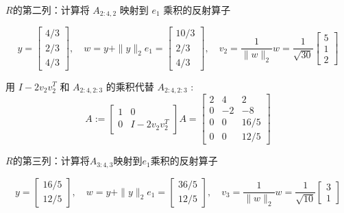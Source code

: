 \begin{problem}
$R$的第二列：计算将 $ A_{2: 4,2} $ 映射到 $ e_{1} $ 乘积的反射算子

\begin{equation}y=\left[\begin{array}{l}
    4 / 3 \\
    2 / 3 \\
    4 / 3
    \end{array}\right], \quad w=y+\|y\|_{2} e_{1}=\left[\begin{array}{r}
    10 / 3 \\
    2 / 3 \\
    4 / 3
    \end{array}\right], \quad v_{2}=\frac{1}{\|w\|_{2}} w=\frac{1}{\sqrt{30}}\left[\begin{array}{l}
    5 \\
    1 \\
    2
    \end{array}\right]
\end{equation}

用 $I-2 v_{2} v_{2}^{T}$ 和 $A_{2: 4,2: 3}$ 的乘积代替 $A_{2: 4,2: 3}$ :
\begin{equation}
A:=\left[\begin{array}{cc}
1 & 0 \\
0 & I-2 v_{2} v_{2}^{T}
\end{array}\right] A=\left[\begin{array}{rrr}
2 & 4 & 2 \\
0 & -2 & -8 \\
0 & 0 & 16 / 5 \\
0 & 0 & 12 / 5
\end{array}\right]
\end{equation}

$R$的第三列：计算将$ A_{3: 4,3} $映射到$e_1$乘积的反射算子

\begin{equation}y=\left[\begin{array}{l}
    16 / 5 \\
    12 / 5
    \end{array}\right], \quad w=y+\|y\|_{2} e_{1}=\left[\begin{array}{c}
    36 / 5 \\
    12 / 5
    \end{array}\right], \quad v_{3}=\frac{1}{\|w\|_{2}} w=\frac{1}{\sqrt{10}}\left[\begin{array}{l}
    3 \\
    1
    \end{array}\right]
\end{equation}


\end{problem}
